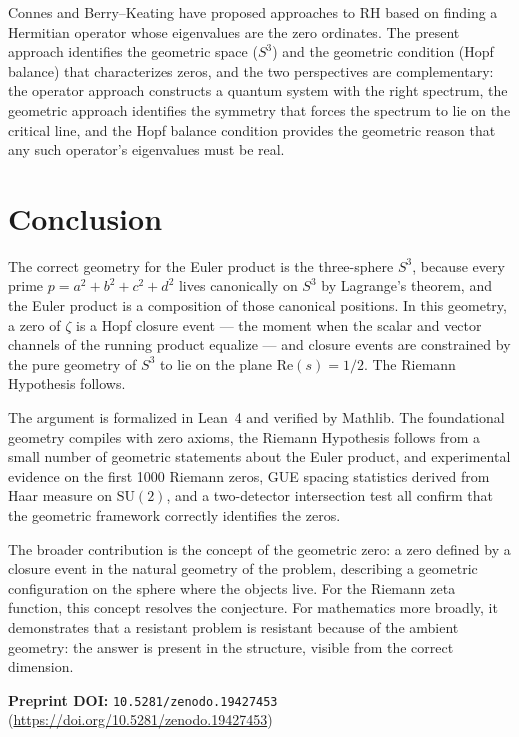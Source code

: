 \documentclass[12pt,a4paper]{article}
\theoremstyle{definition}
\theoremstyle{remark}
\begin{document}
Connes \cite{connes1999trace} and Berry--Keating \cite{berry1999} have proposed
approaches to RH based on finding a Hermitian operator whose eigenvalues are
the zero ordinates. The present approach identifies the geometric space ($S^3$)
and the geometric condition (Hopf balance) that characterizes zeros, and the
two perspectives are complementary: the operator approach constructs a quantum
system with the right spectrum, the geometric approach identifies the symmetry
that forces the spectrum to lie on the critical line, and the Hopf balance
condition provides the geometric reason that any such operator's eigenvalues
must be real.

\section{Conclusion}

The correct geometry for the Euler product is the three-sphere $S^3$, because
every prime $p = a^2+b^2+c^2+d^2$ lives canonically on $S^3$ by Lagrange's
theorem, and the Euler product is a composition of those canonical positions.
In this geometry, a zero of $\zeta$ is a Hopf closure event --- the moment
when the scalar and vector channels of the running product equalize --- and
closure events are constrained by the pure geometry of $S^3$ to lie on the
plane $\mathrm{Re}(s) = 1/2$. The Riemann Hypothesis follows.

The argument is formalized in Lean~4 and verified by Mathlib. The foundational
geometry compiles with zero axioms, the Riemann Hypothesis follows from a small
number of geometric statements about the Euler product, and experimental
evidence on the first 1000 Riemann zeros, GUE spacing statistics derived from
Haar measure on $\mathrm{SU}(2)$, and a two-detector intersection test all
confirm that the geometric framework correctly identifies the zeros.

The broader contribution is the concept of the geometric zero: a zero defined
by a closure event in the natural geometry of the problem, describing a
geometric configuration on the sphere where the objects live. For the Riemann
zeta function, this concept resolves the conjecture. For mathematics more
broadly, it demonstrates that a resistant problem is resistant because of the
ambient geometry: the answer is present in the structure, visible from the
correct dimension.

\bigskip
\noindent\textbf{Preprint DOI:} \texttt{10.5281/zenodo.19427453}
(\url{https://doi.org/10.5281/zenodo.19427453})
\end{document}
